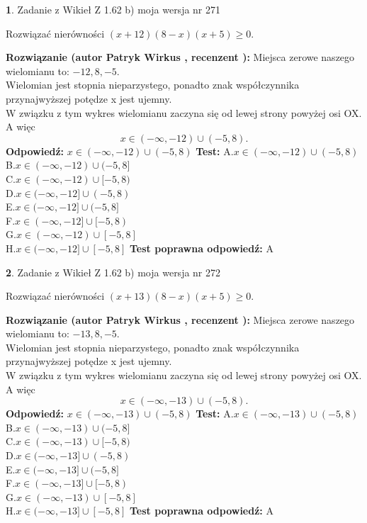 \documentclass[12pt, a4paper]{article}
\theoremstyle{definition} %
\newtheorem{zad}{}
\newcommand{\zadStart}[1]{\begin{zad}#1\newline}
\newcommand{\zadStop}{\end{zad}}
\newcommand{\rozwStart}[2]{\noindent \textbf{Rozwiązanie (autor #1 , recenzent #2): }\newline}
\newcommand{\rozwStop}{\newline}
\newcommand{\odpStart}{\noindent \textbf{Odpowiedź:}\newline}
\newcommand{\odpStop}{\newline}
\newcommand{\testStart}{\noindent \textbf{Test:}\newline}
\newcommand{\testStop}{\newline}
\newcommand{\kluczStart}{\noindent \textbf{Test poprawna odpowiedź:}\newline}
\newcommand{\kluczStop}{\newline}
\begin{document}
\zadStart{Zadanie z Wikieł Z 1.62 b) moja wersja nr 271}

Rozwiązać nierówności $(x+12)(8-x)(x+5)\ge0$.
\zadStop
\rozwStart{Patryk Wirkus}{}
Miejsca zerowe naszego wielomianu to: $-12, 8, -5$.\\
Wielomian jest stopnia nieparzystego, ponadto znak współczynnika przy\linebreak najwyższej potędze x jest ujemny.\\ W związku z tym wykres wielomianu zaczyna się od lewej strony powyżej osi OX. A więc $$x \in (-\infty,-12) \cup (-5,8).$$
\rozwStop
\odpStart
$x \in (-\infty,-12) \cup (-5,8)$
\odpStop
\testStart
A.$x \in (-\infty,-12) \cup (-5,8)$\\
B.$x \in (-\infty,-12) \cup (-5,8]$\\
C.$x \in (-\infty,-12) \cup [-5,8)$\\
D.$x \in (-\infty,-12] \cup (-5,8)$\\
E.$x \in (-\infty,-12] \cup (-5,8]$\\
F.$x \in (-\infty,-12] \cup [-5,8)$\\
G.$x \in (-\infty,-12) \cup [-5,8]$\\
H.$x \in (-\infty,-12] \cup [-5,8]$
\testStop
\kluczStart
A
\kluczStop



\zadStart{Zadanie z Wikieł Z 1.62 b) moja wersja nr 272}

Rozwiązać nierówności $(x+13)(8-x)(x+5)\ge0$.
\zadStop
\rozwStart{Patryk Wirkus}{}
Miejsca zerowe naszego wielomianu to: $-13, 8, -5$.\\
Wielomian jest stopnia nieparzystego, ponadto znak współczynnika przy\linebreak najwyższej potędze x jest ujemny.\\ W związku z tym wykres wielomianu zaczyna się od lewej strony powyżej osi OX. A więc $$x \in (-\infty,-13) \cup (-5,8).$$
\rozwStop
\odpStart
$x \in (-\infty,-13) \cup (-5,8)$
\odpStop
\testStart
A.$x \in (-\infty,-13) \cup (-5,8)$\\
B.$x \in (-\infty,-13) \cup (-5,8]$\\
C.$x \in (-\infty,-13) \cup [-5,8)$\\
D.$x \in (-\infty,-13] \cup (-5,8)$\\
E.$x \in (-\infty,-13] \cup (-5,8]$\\
F.$x \in (-\infty,-13] \cup [-5,8)$\\
G.$x \in (-\infty,-13) \cup [-5,8]$\\
H.$x \in (-\infty,-13] \cup [-5,8]$
\testStop
\kluczStart
A
\kluczStop
\end{document}
